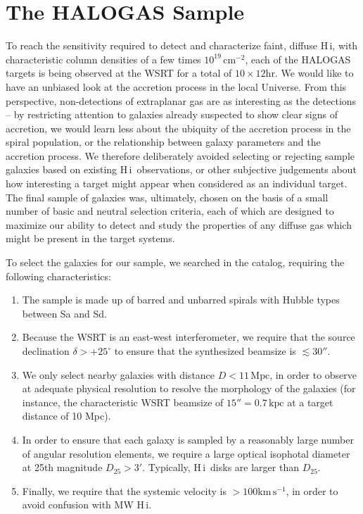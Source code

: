 \documentclass[oldversion]{aa}
\newcommand{\HI}{{\sc H\,i}}
\begin{document}
\section{The HALOGAS Sample}\label{section:sample}

To reach the sensitivity required to detect and characterize faint, diffuse \HI, with characteristic column densities of a few times $10^{19}\,\mathrm{cm^{-2}}$, each of the HALOGAS targets is being observed at the WSRT for a total of $10\times12$hr. We would like to have an unbiased look at the accretion process in the local Universe. From this perspective, non-detections of extraplanar gas are as interesting as the detections -- by restricting attention to galaxies already suspected to show clear signs of accretion, we would learn less about the ubiquity of the accretion process in the spiral population, or the relationship between galaxy parameters and the accretion process. We therefore deliberately avoided selecting or rejecting sample galaxies based on existing \HI\ observations, or other subjective judgements about how interesting a target might appear when considered as an individual target. The final sample of galaxies was, ultimately, chosen on the basis of a small number of basic and neutral selection criteria, each of which are designed to maximize our ability to detect and study the properties of any diffuse gas which might be present in the target systems.

To select the galaxies for our sample, we searched in the \citet{tully_1988} catalog, requiring the following characteristics:
\begin{enumerate}
\item[(i)] The sample is made up of barred and unbarred spirals with Hubble types between Sa and Sd.
\item[(ii)] Because the WSRT is an east-west interferometer, we require that the source declination $\delta>+25^{\circ}$ to ensure that the synthesized beamsize is $\lesssim30''$.
\item[(iii)] We only select nearby galaxies with distance $D<11\,\mathrm{Mpc}$, in order to observe at adequate physical resolution to resolve the morphology of the galaxies (for instance, the characteristic WSRT beamsize of $15''=0.7\,\mathrm{kpc}$ at a target distance of 10 Mpc).
\item[(iv)] In order to ensure that each galaxy is sampled by a reasonably large number of angular resolution elements, we require a large optical isophotal diameter at 25th magnitude $D_{25}>3'$. Typically, \HI\ disks are larger than $D_{25}$.
\item[(v)] Finally, we require that the systemic velocity is $>100\mathrm{km\,s^{-1}}$, in order to avoid confusion with MW \HI.
\end{enumerate}
\end{document}
